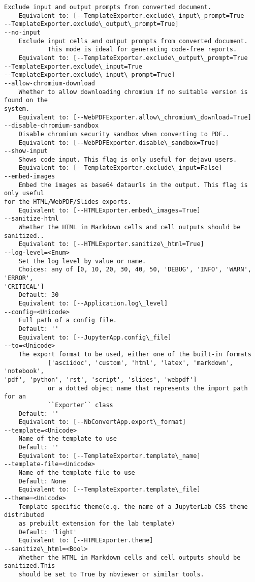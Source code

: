 \documentclass[11pt]{article}
\begin{document}
\begin{Verbatim}[commandchars=\\\{\}]
    Exclude input and output prompts from converted document.
    Equivalent to: [--TemplateExporter.exclude\_input\_prompt=True
--TemplateExporter.exclude\_output\_prompt=True]
--no-input
    Exclude input cells and output prompts from converted document.
            This mode is ideal for generating code-free reports.
    Equivalent to: [--TemplateExporter.exclude\_output\_prompt=True
--TemplateExporter.exclude\_input=True
--TemplateExporter.exclude\_input\_prompt=True]
--allow-chromium-download
    Whether to allow downloading chromium if no suitable version is found on the
system.
    Equivalent to: [--WebPDFExporter.allow\_chromium\_download=True]
--disable-chromium-sandbox
    Disable chromium security sandbox when converting to PDF..
    Equivalent to: [--WebPDFExporter.disable\_sandbox=True]
--show-input
    Shows code input. This flag is only useful for dejavu users.
    Equivalent to: [--TemplateExporter.exclude\_input=False]
--embed-images
    Embed the images as base64 dataurls in the output. This flag is only useful
for the HTML/WebPDF/Slides exports.
    Equivalent to: [--HTMLExporter.embed\_images=True]
--sanitize-html
    Whether the HTML in Markdown cells and cell outputs should be sanitized..
    Equivalent to: [--HTMLExporter.sanitize\_html=True]
--log-level=<Enum>
    Set the log level by value or name.
    Choices: any of [0, 10, 20, 30, 40, 50, 'DEBUG', 'INFO', 'WARN', 'ERROR',
'CRITICAL']
    Default: 30
    Equivalent to: [--Application.log\_level]
--config=<Unicode>
    Full path of a config file.
    Default: ''
    Equivalent to: [--JupyterApp.config\_file]
--to=<Unicode>
    The export format to be used, either one of the built-in formats
            ['asciidoc', 'custom', 'html', 'latex', 'markdown', 'notebook',
'pdf', 'python', 'rst', 'script', 'slides', 'webpdf']
            or a dotted object name that represents the import path for an
            ``Exporter`` class
    Default: ''
    Equivalent to: [--NbConvertApp.export\_format]
--template=<Unicode>
    Name of the template to use
    Default: ''
    Equivalent to: [--TemplateExporter.template\_name]
--template-file=<Unicode>
    Name of the template file to use
    Default: None
    Equivalent to: [--TemplateExporter.template\_file]
--theme=<Unicode>
    Template specific theme(e.g. the name of a JupyterLab CSS theme distributed
    as prebuilt extension for the lab template)
    Default: 'light'
    Equivalent to: [--HTMLExporter.theme]
--sanitize\_html=<Bool>
    Whether the HTML in Markdown cells and cell outputs should be sanitized.This
    should be set to True by nbviewer or similar tools.

\end{Verbatim}
\end{document}
